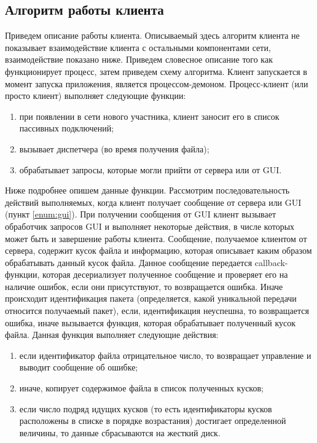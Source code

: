 \subsection{Алгоритм работы клиента}
Приведем описание работы клиента. Описываемый здесь алгоритм клиента
не показывает взаимодействие клиента с остальными компонентами сети,
взаимодействие показано ниже. Приведем словесное описание того как
функционирует процесс, затем приведем схему алгоритма.
\newpar
Клиент запускается в момент запуска приложения, является процессом-демоном.
Процесс-клиент (или просто клиент) выполняет следующие
функции:
\begin{enumerate}
    \item при появлении в сети нового участника, клиент заносит его в список
        пассивных подключений;\label{enum:client}
    \item вызывает диспетчера (во время получения файла);\label{enum:disp}
    \item обрабатывает запросы, которые могли прийти от сервера или от
        GUI.\label{enum:gui}
\end{enumerate}

Ниже подробнее опишем данные функции.
\newpar
Рассмотрим последовательность действий выполняемых, когда клиент
получает сообщение от сервера или GUI (пункт \ref{enum:gui}). При получении
сообщения от GUI клиент вызывает обработчик запросов GUI и выполняет
некоторые действия, в числе которых может быть и завершение работы
клиента. Сообщение, получаемое клиентом от сервера, содержит кусок файла
и информацию, которая описывает каким образом обрабатывать данный
кусок файла. Данное сообщение передается callback-функции, которая
десериализует полученное сообщение и проверяет его на наличие ошибок,
если они присутствуют, то возвращается ошибка. Иначе происходит
идентификация пакета (определяется, какой уникальной передачи относится
получаемый пакет), если, идентификация неуспешна, то возвращается
ошибка, иначе вызывается функция, которая обрабатывает полученный кусок
файла. Данная функция выполняет следующие действия:
\begin{enumerate}
    \item если идентификатор файла отрицательное число, то возвращает
        управление и выводит сообщение об ошибке;
    \item иначе, копирует содержимое файла в список полученных кусков;
    \item если число подряд идущих кусков (то есть идентификаторы кусков
        расположены в списке в порядке возрастания) достигает
        определенной величины, то данные сбрасываются на жесткий диск.
\end{enumerate}

